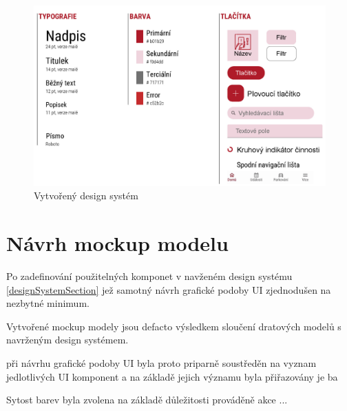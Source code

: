\begin{figure}[H]
  \centering
  \includegraphics[width=.99\textwidth]{design_system.jpg}
  \caption{Vytvořený design systém}
  \label{fig:design_system}
\end{figure}

\section{Návrh mockup modelu} \label{navrhMockupModelu}
Po zadefinování použitelných komponet v navženém design systému \ref{designSystemSection} jež samotný návrh grafické podoby UI zjednodušen 
na nezbytné minimum. 

Vytvořené mockup modely jsou defacto výsledkem sloučení dratových modelů s navrženým design systémem.

při návrhu grafické podoby UI byla proto priparně soustředěn na vyznam jedlotlivých UI komponent a na základě jejich významu byla
přiřazovány je ba

Sytost barev byla zvolena na základě důležitosti prováděně akce  ...

